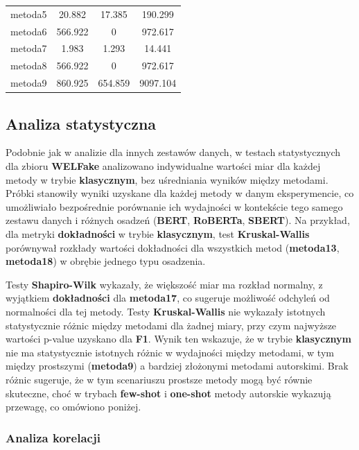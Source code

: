 \begin{table}[H]
\begin{tabular}{lccc}
		metoda5           & 20.882        & 17.385           & 190.299        \\
		metoda6           & 566.922       &   0              & 972.617        \\
		metoda7           & 1.983         & 1.293            & 14.441         \\
		metoda8           & 566.922       &   0              & 972.617        \\
		metoda9           & 860.925       & 654.859          & 9097.104       \\
		\bottomrule
	\end{tabular}
\end{table}

\subsection{Analiza statystyczna}

Podobnie jak w analizie dla innych zestawów danych, w testach statystycznych dla zbioru \textbf{WELFake} analizowano indywidualne wartości miar dla każdej metody w trybie \textbf{klasycznym}, bez uśredniania wyników między metodami. Próbki stanowiły wyniki uzyskane dla każdej metody w danym eksperymencie, co umożliwiało bezpośrednie porównanie ich wydajności w kontekście tego samego zestawu danych i różnych osadzeń (\textbf{BERT}, \textbf{RoBERTa}, \textbf{SBERT}). Na przykład, dla metryki \textbf{dokładności} w trybie \textbf{klasycznym}, test \textbf{Kruskal-Wallis} porównywał rozkłady wartości dokładności dla wszystkich metod (\textbf{metoda13}, \textbf{metoda18}) w obrębie jednego typu osadzenia.

Testy \textbf{Shapiro-Wilk} wykazały, że większość miar ma rozkład normalny, z wyjątkiem \textbf{dokładności} dla \textbf{metoda17}, co sugeruje możliwość odchyleń od normalności dla tej metody. Testy \textbf{Kruskal-Wallis} nie wykazały istotnych statystycznie różnic między metodami dla żadnej miary, przy czym najwyższe wartości p-value uzyskano dla \textbf{F1}. Wynik ten wskazuje, że w trybie \textbf{klasycznym} nie ma statystycznie istotnych różnic w wydajności między metodami, w tym między prostszymi (\textbf{metoda9}) a bardziej złożonymi metodami autorskimi. Brak różnic sugeruje, że w tym scenariuszu prostsze metody mogą być równie skuteczne, choć w trybach \textbf{few-shot} i \textbf{one-shot} metody autorskie wykazują przewagę, co omówiono poniżej.

\subsubsection{Analiza korelacji}

